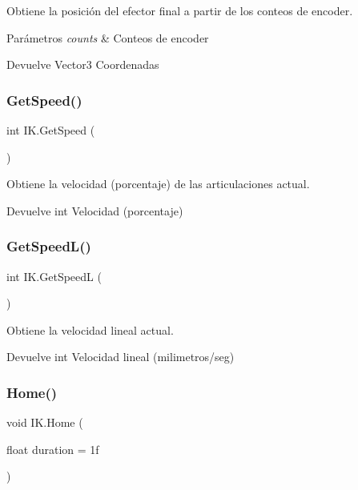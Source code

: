 Obtiene la posición del efector final a partir de los conteos de encoder. 
\begin{DoxyParams}{Parámetros}
{\em counts} & Conteos de encoder \\
\hline
\end{DoxyParams}
\begin{DoxyReturn}{Devuelve}
Vector3 Coordenadas 
\end{DoxyReturn}
\mbox{\label{class_i_k_a4560c82ff2f46414e095e7fb37283f39}} 
\subsubsection{\texorpdfstring{GetSpeed()}{GetSpeed()}}
{\footnotesize\ttfamily int I\+K.\+Get\+Speed (\begin{DoxyParamCaption}{ }\end{DoxyParamCaption})\hspace{0.3cm}{\ttfamily [inline]}}

Obtiene la velocidad (porcentaje) de las articulaciones actual. \begin{DoxyReturn}{Devuelve}
int Velocidad (porcentaje) 
\end{DoxyReturn}
\mbox{\label{class_i_k_ae3121a6a82a3ae9216c480d4e9f117a9}} 
\subsubsection{\texorpdfstring{GetSpeedL()}{GetSpeedL()}}
{\footnotesize\ttfamily int I\+K.\+Get\+SpeedL (\begin{DoxyParamCaption}{ }\end{DoxyParamCaption})\hspace{0.3cm}{\ttfamily [inline]}}

Obtiene la velocidad lineal actual. \begin{DoxyReturn}{Devuelve}
int Velocidad lineal (milimetros/seg) 
\end{DoxyReturn}
\mbox{\label{class_i_k_a1a8f3eb230e800c10dec985b81623121}} 
\subsubsection{\texorpdfstring{Home()}{Home()}}
{\footnotesize\ttfamily void I\+K.\+Home (\begin{DoxyParamCaption}\item[{float}]{duration = {\ttfamily 1f} }\end{DoxyParamCaption})\hspace{0.3cm}{\ttfamily [inline]}}

